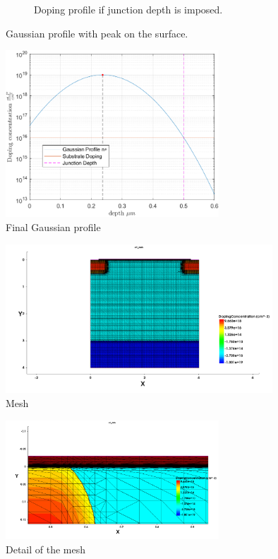 \documentclass[11pt,a4paper]{article}
\begin{document}
\begin{figure}
\begin{subfigure}[b]{0.45\textwidth}
				\caption{Doping profile if junction depth is imposed.}
				\label{gauss2}
			\end{subfigure}
			\caption{Gaussian profile with peak on the surface.}
		\end{figure}
		\begin{figure}
			\centering
			\includegraphics[width=80mm]{gauss4}
			\caption{Final Gaussian profile}
			\label{gauss4}
		\end{figure}
		\begin{figure}
			\centering
			\includegraphics[width=100mm]{meshing1}
			\caption{Mesh}
			\label{meshing}
		\end{figure}
		\begin{figure}
			\centering
			\includegraphics[width=80mm]{meshing_detail}
			\caption{Detail of the mesh}
			\label{meshingdetail}
		\end{figure}
		
\end{document}
